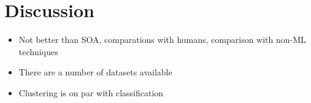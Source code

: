 \section{Discussion}

\begin{itemize}
  \item Not better than SOA, comparations with humans, comparison with non-ML
  techniques
  \item There are a number of datasets available
  \item Clustering is on par with classification
\end{itemize}



